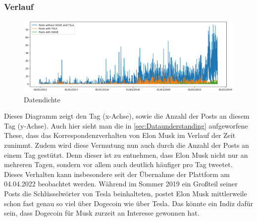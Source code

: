 \documentclass{article}
\begin{document}
\subsubsection{Verlauf}
\begin{figure}[!htb]
  	\includegraphics[width=\textwidth, center]{./imgs/Verlauf.png}
 	\caption{Datendichte}
 	\label{fig:Datendichte}
\end{figure}
Dieses Diagramm zeigt den Tag (x-Achse), sowie die Anzahl der Posts an diesem Tag (y-Achse). Auch hier sieht man die in \ref{sec:Dataunderstanding} aufgeworfene These, dass das Korrespondenzverhalten von Elon Musk im Verlauf der Zeit zunimmt.
Zudem wird diese Vermutung nun auch durch die Anzahl der Posts an einem Tag gestützt.
Denn dieser ist zu entnehmen, dass Elon Musk nicht nur an mehreren Tagen, sondern vor allem auch deutlich häufiger pro Tag tweetet.
Dieses Verhalten kann insbesondere seit der Übernahme der Plattform am 04.04.2022 beobachtet werden.
Während im Sommer 2019 ein Großteil seiner Posts die Schlüsselwörter von Tesla beinhalteten, postet Elon Musk mittlerweile schon fast genau so viel über Dogecoin wie über Tesla. Das könnte ein Indiz dafür sein, dass Dogecoin für Musk zurzeit an Interesse gewonnen hat.
\end{document}

